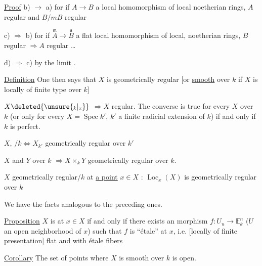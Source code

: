 \uline{Proof} b) $\to$ a) for if $A\to B$ a  local homomorphism of local noetherian rings, $A$ regular and $B/mB$ regular 

c) $\Rightarrow$ b) for if $\overset{\mathfrak m}{A}\to\overset{\mathfrak n}{B}$ a flat local homomorphism of local, noetherian rings,  $B$ regular $\Rightarrow A$ regular \ldots

d) $\Rightarrow$ c) by the limit .

\uline{Definition} One then says that $X$ is geometrically regular [or \uline{smooth} over $k$ if $X$ is locally of finite type over $k$]

$X\deleted{\unsure{{}_k|{}_x}}$  $\Longrightarrow X$ regular. The converse is true for every $X$ over $k$ (or only for every $X=\operatorname{Spec}k'$, $k'$ a finite radicial extension of $k$) if and only if $k$ is perfect.

$X$,  $/k\Longleftrightarrow X_{k'}$ geometrically regular over $k'$

$X$ and $Y$  over $k$ $\Longrightarrow X\times_kY$ geometrically regular over $k$.

$X$  geometrically regular/$k$ at \uline{a point} $x\in X$ : $\operatorname{Loc}_x(X)$ is geometrically regular over $k$ 

We have the facts analogous to the preceding ones.


\uline{Proposition} $X$  is  at $x\in X$ if and only if there exists an  morphism $f:U_u\longrightarrow\mathbb E^n_k$ ($U$ an open neighborhood of $x$) such that $f$ is ``étale'' at $x$, i.e. [locally of finite presentation] flat and with étale fibers

\uline{Corollary} The set of points where $X$ is  smooth over $k$ is open.
